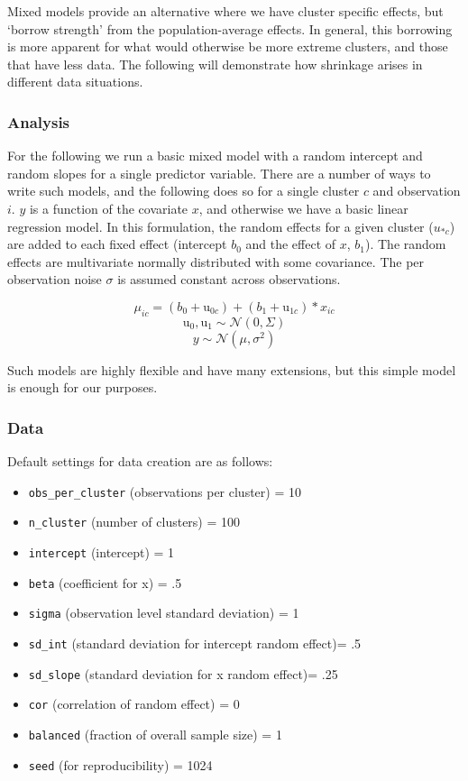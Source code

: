 \documentclass[
  12pt,
]{book}
\providecommand{\tightlist}{%
  \setlength{\itemsep}{0pt}\setlength{\parskip}{0pt}}
\begin{document}
Mixed models provide an alternative where we have cluster specific effects, but `borrow strength' from the population-average effects. In general, this borrowing is more apparent for what would otherwise be more extreme clusters, and those that have less data. The following will demonstrate how shrinkage arises in different data situations.

\hypertarget{analysis}{%
\subsubsection{Analysis}\label{analysis}}

For the following we run a basic mixed model with a random intercept and random slopes for a single predictor variable. There are a number of ways to write such models, and the following does so for a single cluster \(c\) and observation \(i\). \(y\) is a function of the covariate \(x\), and otherwise we have a basic linear regression model. In this formulation, the random effects for a given cluster (\(u_{* c}\)) are added to each fixed effect (intercept \(b_0\) and the effect of \(x\), \(b_1\)). The random effects are multivariate normally distributed with some covariance. The per observation noise \(\sigma\) is assumed constant across observations.

\[\mu_{ic} = (b_0 + \mathrm{u}_{0c})+ (b_1+\mathrm{u}_{1c}) * x_{ic}\]
\[\mathrm{u}_{0}, \mathrm{u}_{1} \sim \mathcal{N}(0, \Sigma)\]
\[y \sim \mathcal{N}(\mu, \sigma^2)\]

Such models are highly flexible and have many extensions, but this simple model is enough for our purposes.

\hypertarget{data}{%
\subsubsection{Data}\label{data}}

Default settings for data creation are as follows:

\begin{itemize}
\tightlist
\item
  \texttt{obs\_per\_cluster} (observations per cluster) = 10
\item
  \texttt{n\_cluster} (number of clusters) = 100
\item
  \texttt{intercept} (intercept) = 1
\item
  \texttt{beta} (coefficient for x) = .5
\item
  \texttt{sigma} (observation level standard deviation) = 1
\item
  \texttt{sd\_int} (standard deviation for intercept random effect)= .5
\item
  \texttt{sd\_slope} (standard deviation for x random effect)= .25
\item
  \texttt{cor} (correlation of random effect) = 0
\item
  \texttt{balanced} (fraction of overall sample size) = 1
\item
  \texttt{seed} (for reproducibility) = 1024
\end{itemize}
\end{document}
